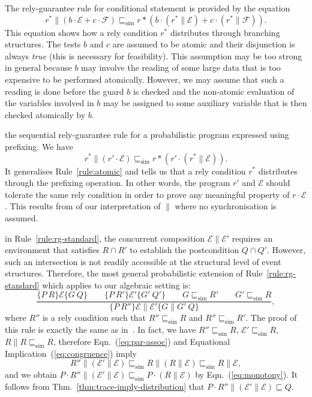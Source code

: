 \documentclass[review]{elsart}
\newcommand{\EE}{\mathcal{E}}
\newcommand{\FF}{\mathcal{F}}
\newcommand{\triple}[3]{\{#1\}#2\{#3\}}
\newcommand{\bks}{*}
\newcommand{\refby}{\sqsubseteq}
\newcommand{\simref}{\refby_{\mathrm{sim}}}
\newcommand{\Eqn}[1]{Eqn.~(\ref{#1})}
\newcommand{\Thm}[1]{Thm.~\ref{#1}}
\begin{document}
The rely-guarantee rule for conditional statement is provided by the equation
\begin{equation}\label{rule:conditional}
r^{\bks}\|(b{\cdot} \EE {+} c{\cdot}\FF) \simref  r{\bks}(b{\cdot} (r^{\bks}\|\EE) {+} c{\cdot}(r^{\bks}\|\FF)).
\end{equation}
This equation shows how a rely condition $r^{\bks}$ distributes through branching structures. The tests $b$ and $c$ are assumed to be atomic and their disjunction is always \emph{true} (this is necessary for feasibility). This assumption may be too strong in general because $b$ may involve the reading of some large data that is too expensive to be performed atomically. However, we may assume that such a reading is done before the guard $b$ is checked and the non-atomic evaluation of the variables involved in $b$ may be assigned to some auxiliary variable that is then checked atomically by $b$.

the sequential rely-guarantee rule for a probabilistic program expressed using prefixing. We have  
\begin{equation}\label{rule:prefix}
r^{\bks}\|(r'{\cdot}\EE)\simref r{\bks}(r'{\cdot}(r^{\bks}\|\EE)).
\end{equation}
It generalises Rule~\ref{rule:atomic} and tells us that a rely condition $r^{\bks}$ distributes through the prefixing operation. In other words, the program $r'$ and  $\EE$ should tolerate the same rely condition in order to prove any meaningful property of $r{\cdot}\EE$. This results from of our interpretation of $\|$ where no synchronisation is assumed. 

in Rule~\ref{rule:rg-standard}, the concurrent composition $\EE\|\EE'$ requires an environment that satisfies $R{\cap} R'$ to establish the postcondition $Q{\cap} Q'$. However, such an intersection is not readily accessible at the structural level of event structures. Therefore, the most general probabilistic extension of Rule~\ref{rule:rg-standard} which applies to our algebraic setting is:
\begin{equation}\label{rule:rg-general}
\frac{\triple{P\ R}{\EE}{G\ Q}\qquad \triple{P\ R'}{\EE'}{G'\ Q'}\qquad G\simref R'\qquad G'\simref R}{\triple{P\ R''}{\EE\|\EE'}{G\|G'\ Q}},
\end{equation}
where $R''$ is a rely condition such that $R''\simref R$ and $R''\simref R'$.
The proof of this rule is exactly the same as in~\cite{Hoa11,Rab13}. In fact, we have $R''\simref R$, $\EE'\simref R$, $R\| R\simref R$, therefore \Eqn{eq:par-assoc} and Equational Implication~(\ref{eq:congruence}) imply 
\[
	R''\|(\EE'\|\EE)  \simref  R\|(R\|\EE)\simref R\|\EE,
\]
and we obtain $P{\cdot} R''\|(\EE'\|\EE) \simref P{\cdot} (R\|\EE)$ by \Eqn{eq:monotony}. It follows from \Thm{thm:trace-imply-distribution} that $P{\cdot} R''\|(\EE'\|\EE) \refby Q$. 
\end{document}
